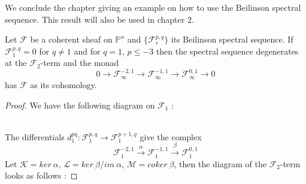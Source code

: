 \documentclass[
	oldfontcommands,
	sumario=abnt-6027-2012,
	12pt,			%
	openright,		%
	oneside,		%
	a4paper,		%
	english,		%
	brazil			%
	]{imecc-unicamp}
\begin{document}
We conclude the chapter giving an example on how to use the Beilinson spectral sequence. This result will also be used in chapter 2.
\begin{lemma}\label{lemabeilinson}
Let $\mathcal{F}$ be a coherent sheaf on $\mathbb{P}^n$ and $\{ \mathcal{F}^{p,q}_r \}$ its Beilinson spectral sequence. If $\mathcal{F}^{p,q}_1=0$ for $q \not=1$ and for $q=1$, $p \leq -3$ then the spectral sequence degenerates at the $\mathcal{F}_2$-term and the monad
\begin{equation}
0 \to \mathcal{F}^{-2,1}_\infty \to \mathcal{F}^{-1,1}_\infty \to \mathcal{F}^{0,1}_\infty \to 0
\end{equation}
has $\mathcal{F}$ as its cohomology.
\end{lemma}
\begin{proof}
We have the following diagram on $\mathcal{F}_1$ : \\
 \\
The differentials $d^{pq}_1: \mathcal{F}^{p,q}_1 \to \mathcal{F}^{p+1,q}_1$ give the complex 
\begin{equation}
\mathcal{F}^{-2,1}_1 \overset{\alpha}{\to} \mathcal{F}^{-1,1}_1 \overset{\beta}{\to} \mathcal{F}^{0,1}_1
\end{equation}
Let $\mathcal{K}=ker \ \alpha$, $\mathcal{L}=ker \ \beta / im \ \alpha$, $\mathcal{M}=coker \ \beta$, then the diagram of the $\mathcal{F}_2$-term looks as follows :


\end{proof}
\end{document}
